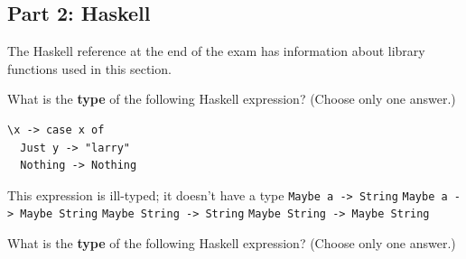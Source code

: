 \documentclass[addpoints]{exam}
\begin{document}
\begin{questions}

\newpage

\subsection*{\textbf{Part 2: Haskell}}

\noindent The Haskell reference at the end of the exam has information about library functions used in this section.

\question[3] What is the \textbf{type} of the following Haskell expression? (Choose only one answer.)

\begin{verbatim}
\x -> case x of
  Just y -> "larry"
  Nothing -> Nothing
\end{verbatim}

\begin{checkboxes}
  \CorrectChoice This expression is ill-typed; it doesn't have a type
  \choice \verb|Maybe a -> String|
  \choice \verb|Maybe a -> Maybe String|
  \choice \verb|Maybe String -> String|
  \choice \verb|Maybe String -> Maybe String|
\end{checkboxes}

\question[3] What is the \textbf{type} of the following Haskell expression? (Choose only one answer.)


\end{questions}
\end{document}
